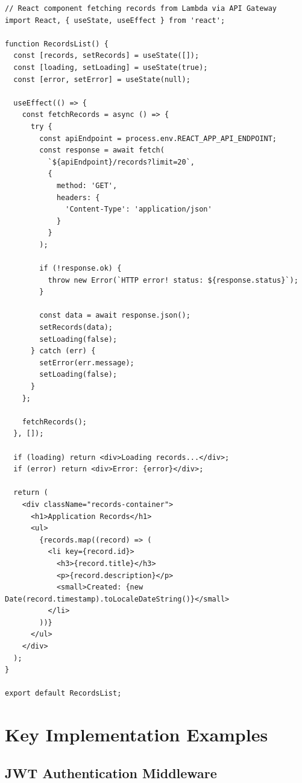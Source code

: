 \begin{lstlisting}[basicstyle=\ttfamily\small, caption=React Component Calling Lambda via API Gateway, captionpos=b]
// React component fetching records from Lambda via API Gateway
import React, { useState, useEffect } from 'react';

function RecordsList() {
  const [records, setRecords] = useState([]);
  const [loading, setLoading] = useState(true);
  const [error, setError] = useState(null);

  useEffect(() => {
    const fetchRecords = async () => {
      try {
        const apiEndpoint = process.env.REACT_APP_API_ENDPOINT;
        const response = await fetch(
          `${apiEndpoint}/records?limit=20`,
          {
            method: 'GET',
            headers: {
              'Content-Type': 'application/json'
            }
          }
        );

        if (!response.ok) {
          throw new Error(`HTTP error! status: ${response.status}`);
        }

        const data = await response.json();
        setRecords(data);
        setLoading(false);
      } catch (err) {
        setError(err.message);
        setLoading(false);
      }
    };

    fetchRecords();
  }, []);

  if (loading) return <div>Loading records...</div>;
  if (error) return <div>Error: {error}</div>;

  return (
    <div className="records-container">
      <h1>Application Records</h1>
      <ul>
        {records.map((record) => (
          <li key={record.id}>
            <h3>{record.title}</h3>
            <p>{record.description}</p>
            <small>Created: {new Date(record.timestamp).toLocaleDateString()}</small>
          </li>
        ))}
      </ul>
    </div>
  );
}

export default RecordsList;
\end{lstlisting}

\section{Key Implementation Examples}

\subsection{JWT Authentication Middleware}


